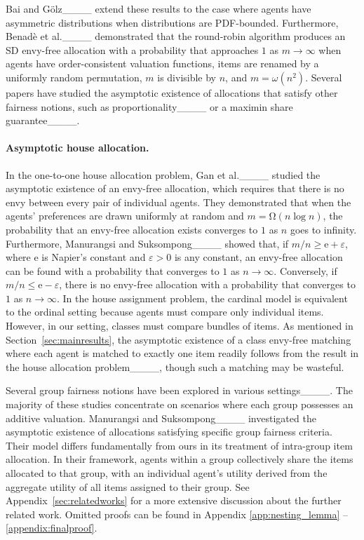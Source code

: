 Bai and G\"{o}lz____ extend these results to the case where agents have asymmetric distributions when distributions are PDF-bounded.
Furthermore, Benad\`{e} et al.____ demonstrated that the round-robin algorithm produces an SD envy-free allocation with a probability that approaches $1$ as $m\to\infty$ when agents have order-consistent valuation functions, items are renamed by a uniformly random permutation, $m$ is divisible by $n$, and $m=\omega(n^2)$.
Several papers have studied the asymptotic existence of allocations that satisfy other fairness notions, such as proportionality____ or a maximin share guarantee____. 



\paragraph{Asymptotic house allocation.}
In the one-to-one house allocation problem, Gan et al.____ studied the asymptotic existence of an envy-free allocation, which requires that there is no envy between every pair of individual agents. 
They demonstrated that when the agents' preferences are drawn uniformly at random and $m=\mathrm{\Omega}(n\log n)$, the probability that an envy-free allocation exists converges to $1$ as $n$ goes to infinity.
Furthermore, Manurangsi and Suksompong____ showed that, if $m/n\geq\mathrm{e}+\varepsilon$, where $\mathrm{e}$ is Napier's constant and $\varepsilon>0$ is any constant, an envy-free allocation can be found with a probability that converges to $1$ as $n\to \infty$. Conversely, if $m/n\leq\mathrm{e}-\varepsilon$, there is no envy-free allocation with a probability that converges to $1$ as $n\to \infty$. 
In the house assignment problem, the cardinal model is equivalent to the ordinal setting because agents must compare only individual items. However, in our setting, classes must compare bundles of items. 
As mentioned in Section~\ref{sec:mainresults}, the asymptotic existence of a class envy-free matching where each agent is matched to exactly one item readily follows from the result in the house allocation problem____, though such a matching may be wasteful. 



Several group fairness notions have been explored in various settings____. 
The majority of these studies concentrate on scenarios where each group possesses an additive valuation.
%
Manurangsi and Suksompong____ investigated the asymptotic existence of allocations satisfying specific group fairness criteria. Their model differs fundamentally from ours in its treatment of intra-group item allocation. 
In their framework, agents within a group collectively share the items allocated to that group, with an individual agent's utility derived from the aggregate utility of all items assigned to their group. See Appendix~\ref{sec:relatedworks} for a more extensive discussion about the further related work. Omitted proofs can be found in Appendix \ref{app:nesting_lemma} -- \ref{appendix:finalproof}. 
\fi



